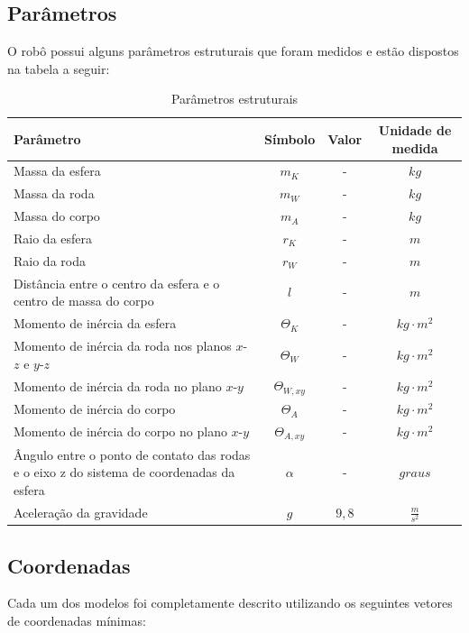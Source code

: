 \subsection{Parâmetros}

O robô possui alguns parâmetros estruturais que foram medidos e estão dispostos na tabela a seguir:

\begin{table}[H]
\centering
\begin{tabular}{|m{6cm}|c|c|c|}
\hline
Parâmetro & Símbolo  & Valor & Unidade de medida \\ \hline
Massa da esfera & $m_K$  & - & $kg$ \\ \hline
Massa da roda & $m_W$  & - & $kg$ \\ \hline
Massa do corpo & $m_A$  & - & $kg$ \\ \hline
Raio da esfera & $r_K$  & - & $m$ \\ \hline
Raio da roda & $r_W$  & - & $m$ \\ \hline
Distância entre o centro da esfera e o centro de massa do corpo & $l$ & - & $m$ \\ \hline
Momento de inércia da esfera & $\Theta_K$  & - & $kg \cdot m^2$ \\ \hline
Momento de inércia da roda nos planos $x$-$z$ e $y$-$z$ & $\Theta_W$  & - & $kg \cdot m^2$ \\ \hline
Momento de inércia da roda no plano $x$-$y$ & $\Theta_{W,xy}$  & - & $kg \cdot m^2$ \\ \hline
Momento de inércia do corpo & $\Theta_{A}$  & - & $kg \cdot m^2$ \\ \hline
Momento de inércia do corpo no plano $x$-$y$ & $\Theta_{A,xy}$  & - & $kg \cdot m^2$ \\ \hline
Ângulo entre o ponto de contato das rodas e o eixo z do sistema de coordenadas da esfera & $\alpha$  & - & $graus$ \\ \hline
Aceleração da gravidade & $g$  & $9,8$ & $\frac{m}{s^2}$ \\ \hline
\end{tabular}
\caption{Parâmetros estruturais}
\label{tab:tabela1}
\end{table}

\subsection{Coordenadas}

Cada um dos modelos foi completamente descrito utilizando os seguintes vetores de coordenadas mínimas:

